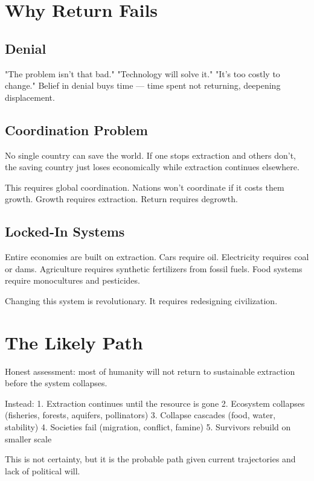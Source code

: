 \documentclass[12pt]{article}
\begin{document}
\section{Why Return Fails}

\subsection{Denial}

"The problem isn't that bad." "Technology will solve it." "It's too costly to change." Belief in denial buys time — time spent not returning, deepening displacement.

\subsection{Coordination Problem}

No single country can save the world. If one stops extraction and others don't, the saving country just loses economically while extraction continues elsewhere.

This requires global coordination. Nations won't coordinate if it costs them growth. Growth requires extraction. Return requires degrowth.

\subsection{Locked-In Systems}

Entire economies are built on extraction. Cars require oil. Electricity requires coal or dams. Agriculture requires synthetic fertilizers from fossil fuels. Food systems require monocultures and pesticides.

Changing this system is revolutionary. It requires redesigning civilization.

\section{The Likely Path}

Honest assessment: most of humanity will not return to sustainable extraction before the system collapses.

Instead:
1. Extraction continues until the resource is gone
2. Ecosystem collapses (fisheries, forests, aquifers, pollinators)
3. Collapse cascades (food, water, stability)
4. Societies fail (migration, conflict, famine)
5. Survivors rebuild on smaller scale

This is not certainty, but it is the probable path given current trajectories and lack of political will.
\end{document}
